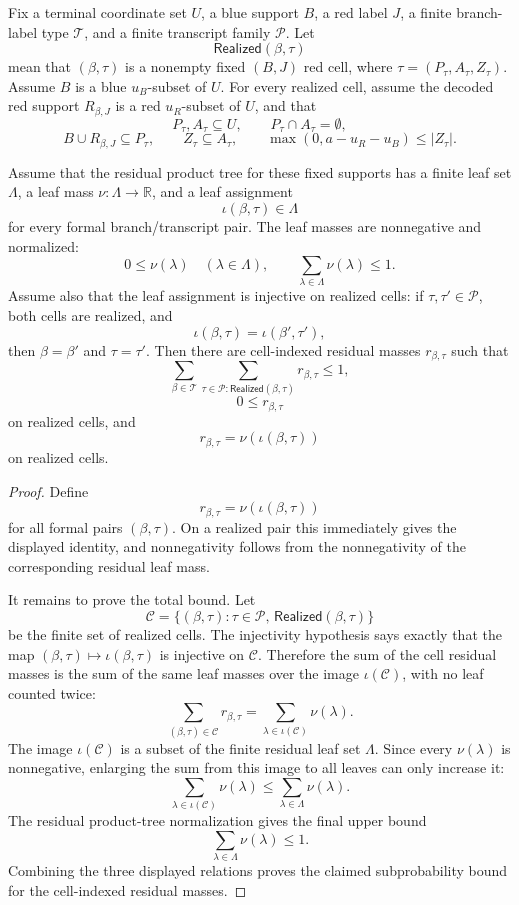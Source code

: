 \begin{helper}
Fix a terminal coordinate set \(U\), a blue support \(B\), a red label
\(J\), a finite branch-label type \(\mathcal T\), and a finite transcript
family \(\mathcal P\).  Let
\[
\mathsf{Realized}(\beta,\tau)
\]
mean that \((\beta,\tau)\) is a nonempty fixed \((B,J)\) red cell, where
\(\tau=(P_\tau,A_\tau,Z_\tau)\).  Assume \(B\) is a blue \(u_B\)-subset of
\(U\).  For every realized cell, assume the decoded red support
\(R_{\beta,J}\) is a red \(u_R\)-subset of \(U\), and that
\[
P_\tau,A_\tau\subseteq U,\qquad P_\tau\cap A_\tau=\emptyset,
\]
\[
B\cup R_{\beta,J}\subseteq P_\tau,\qquad Z_\tau\subseteq A_\tau,\qquad
\max(0,a-u_R-u_B)\le |Z_\tau|.
\]

Assume that the residual product tree for these fixed supports has a finite
leaf set \(\Lambda\), a leaf mass \(\nu:\Lambda\to\mathbb R\), and a leaf
assignment
\[
\iota(\beta,\tau)\in\Lambda
\]
for every formal branch/transcript pair.  The leaf masses are nonnegative
and normalized:
\[
0\le \nu(\lambda)\quad(\lambda\in\Lambda),\qquad
\sum_{\lambda\in\Lambda}\nu(\lambda)\le1.
\]
Assume also that the leaf assignment is injective on realized cells: if
\(\tau,\tau'\in\mathcal P\), both cells are realized, and
\[
\iota(\beta,\tau)=\iota(\beta',\tau'),
\]
then \(\beta=\beta'\) and \(\tau=\tau'\).  Then there are cell-indexed
residual masses \(r_{\beta,\tau}\) such that
\[
\sum_{\beta\in\mathcal T}
  \sum_{\tau\in\mathcal P:\mathsf{Realized}(\beta,\tau)}
    r_{\beta,\tau}\le1,
\]
\[
0\le r_{\beta,\tau}
\]
on realized cells, and
\[
r_{\beta,\tau}=\nu(\iota(\beta,\tau))
\]
on realized cells.
\end{helper}
\begin{proof}
Define
\[
r_{\beta,\tau}=\nu(\iota(\beta,\tau))
\]
for all formal pairs \((\beta,\tau)\).  On a realized pair this immediately
gives the displayed identity, and nonnegativity follows from the
nonnegativity of the corresponding residual leaf mass.

It remains to prove the total bound.  Let
\[
\mathcal C=\{(\beta,\tau):\tau\in\mathcal P,\,
  \mathsf{Realized}(\beta,\tau)\}
\]
be the finite set of realized cells.  The injectivity hypothesis says exactly
that the map \((\beta,\tau)\mapsto\iota(\beta,\tau)\) is injective on
\(\mathcal C\).  Therefore the sum of the cell residual masses is the sum of
the same leaf masses over the image \(\iota(\mathcal C)\), with no leaf
counted twice:
\[
\sum_{(\beta,\tau)\in\mathcal C} r_{\beta,\tau}
=
\sum_{\lambda\in\iota(\mathcal C)} \nu(\lambda).
\]
The image \(\iota(\mathcal C)\) is a subset of the finite residual leaf set
\(\Lambda\).  Since every \(\nu(\lambda)\) is nonnegative, enlarging the sum
from this image to all leaves can only increase it:
\[
\sum_{\lambda\in\iota(\mathcal C)} \nu(\lambda)
\le
\sum_{\lambda\in\Lambda}\nu(\lambda).
\]
The residual product-tree normalization gives the final upper bound
\[
\sum_{\lambda\in\Lambda}\nu(\lambda)\le1.
\]
Combining the three displayed relations proves the claimed subprobability
bound for the cell-indexed residual masses.
\end{proof}
